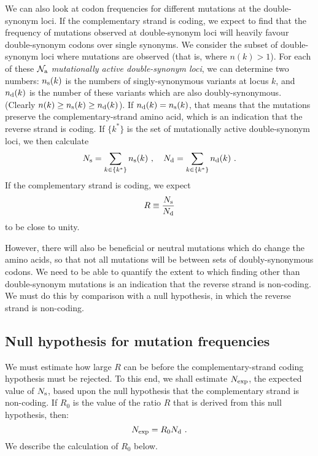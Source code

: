 \documentclass[unnumsec,webpdf,contemporary,large,namedate]{oup-authoring-template}%
\theoremstyle{thmstyleone}%
\theoremstyle{thmstyletwo}%
\theoremstyle{thmstylethree}%
\begin{document}
We can also look at codon frequencies for different mutations at the double-synonym loci. 
If the complementary strand is coding, we expect to find that the frequency of mutations 
observed at double-synonym loci will heavily favour double-synonym codons over 
single synonyms.  We consider the subset of double-synonym loci where mutations 
are observed (that is, where $n(k)>1$). For each of these ${\mathcal N}_{\rm a}$ \emph{mutationally 
active double-synonym loci}, we can determine two numbers: $n_{\rm s}(k)$ is 
the numbers of singly-synonymous variants at locus $k$, and $n_{\rm d}(k)$ is the number 
of these variants which are also doubly-synonymous. (Clearly $n(k)\ge n_{\rm s}(k)\ge n_{\rm d}(k)$). 
If $n_{\rm d}(k)=n_{\rm s}(k)$, that means that the mutations preserve the complementary-strand 
amino acid, which is an indication that the reverse strand is coding. If $\{k^\ast\}$ 
is the set of mutationally active double-synonym loci, we then
calculate
%
\begin{equation}
\label{eq: 3.2}
N_{\rm s}=\sum_{k\in\{k^\ast\}} n_{\rm s}(k)
\ ,\ \ \ 
N_{\rm d}=\sum_{k\in\{k^\ast\}} n_{\rm d}(k)
\ .
\end{equation}
%
If the complementary strand is coding, we expect 
%
\begin{equation}
\label{eq: 3.3}
R\equiv \frac{N_{\rm s}}{N_{\rm d}}
\end{equation}
%
to be close to unity.

However, there will also be beneficial 
or neutral mutations which do change the amino acids, so that not all mutations 
will be between sets of doubly-synonymous codons. We need to be able to 
quantify the extent to which finding other than double-synonym mutations is 
an indication that the reverse strand is non-coding. We must do this by comparison with 
a null hypothesis, in which the reverse strand is non-coding. 

\subsection{Null hypothesis for mutation frequencies}
\label{sec: 3.3}

We must estimate how large $R$ can be before the complementary-strand coding hypothesis must 
be rejected. To this end, we shall estimate $N_{\rm exp}$, the expected value of $N_{\rm s}$, 
based upon the null hypothesis that the complementary strand is non-coding. 
If $R_0$ is the value of the ratio $R$ that is derived from this null hypothesis, then: 
%
\begin{equation}
\label{eq: 3.4}
N_{\rm exp}=R_0 N_{\rm d}
\ .
\end{equation}
%
We describe the calculation of $R_0$ below. 
\end{document}
